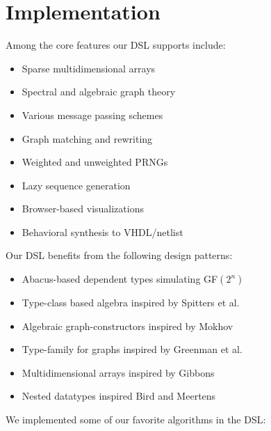 \documentclass[sigplan,10pt,review,anonymous]{acmart}
\begin{document}
\section{Implementation}

Among the core features our DSL supports include:

\begin{itemize}
  \item Sparse multidimensional arrays
  \item Spectral and algebraic graph theory
  \item Various message passing schemes
  \item Graph matching and rewriting
  \item Weighted and unweighted PRNGs
  \item Lazy sequence generation
  \item Browser-based visualizations
  \item Behavioral synthesis to VHDL/netlist
\end{itemize}

\noindent Our DSL benefits from the following design patterns:

\begin{itemize}
  \item Abacus-based dependent types simulating GF$(2^n)$
  \item Type-class based algebra inspired by Spitters et al.~\citep{spitters2011type}
  \item Algebraic graph-constructors inspired by Mokhov~\citep{mokhov2017algebraic}
  \item Type-family for graphs inspired by Greenman et al.~\citep{greenman2014getting}
  \item Multidimensional arrays inspired by Gibbons~\citep{gibbons2017aplicative}
  \item Nested datatypes inspired Bird and Meertens~\cite{bird1998nested}
\end{itemize}

\noindent We implemented some of our favorite algorithms in the DSL:
\end{document}

